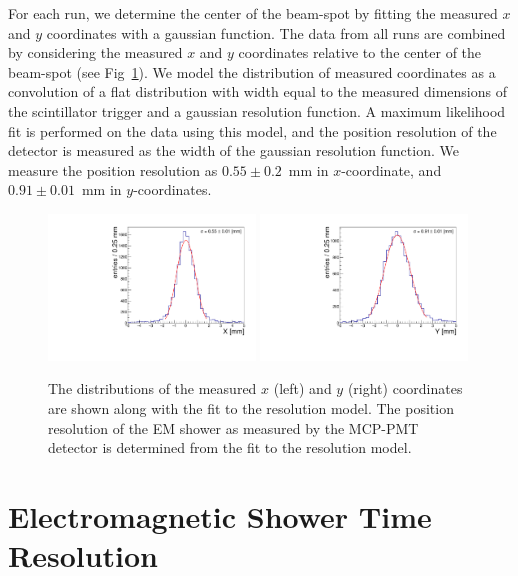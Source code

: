 For each run, we determine the center of the beam-spot by fitting the measured
$x$ and $y$ coordinates with a gaussian function. The data from all runs are
combined by considering the measured $x$ and $y$ coordinates relative to the
center of the beam-spot (see Fig~\ref{fig:ResolutionMeasurement}). We model the
distribution of measured coordinates as a convolution of a flat distribution
with width equal to the measured dimensions of the scintillator trigger and a
gaussian resolution function. A maximum likelihood fit is performed on the data
using this model, and the position resolution of the detector is measured as the
width of the gaussian resolution function. We measure the position resolution as
$0.55\pm0.2$~mm in $x$-coordinate, and $0.91\pm 0.01$~mm in $y$-coordinates.

\begin{figure}[htbp] \centering
\includegraphics[width=0.49\textwidth]{Images/XYResolution/X_Resolution_fixedTrigger.pdf}
\includegraphics[width=0.49\textwidth]{Images/XYResolution/Y_Resolution_fixedTrigger.pdf}
\caption{The distributions of the measured $x$ (left) and $y$ (right)
coordinates are shown along with the fit to the resolution model. The position
resolution of the EM shower as measured by the MCP-PMT detector is determined from
the fit to the resolution model. } \label{fig:ResolutionMeasurement}
\end{figure}

\section{ Electromagnetic Shower Time Resolution } 
\label{sec:timing} 


